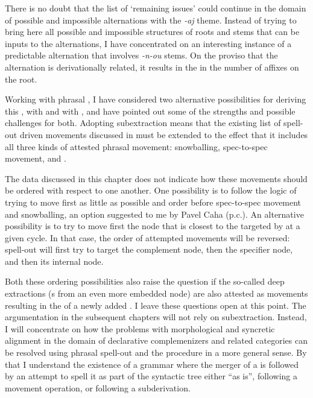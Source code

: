 There is no doubt that the list of `remaining issues' could continue in the domain of possible and impossible  alternations with the \textit{-aj} theme.  Instead of trying to bring here all possible and impossible structures of roots and stems that can be inputs to the alternations, I have concentrated on an interesting instance of a predictable alternation that involves \textit{-n-ou} stems. On the proviso that the alternation is derivationally related, it results in the  in the number of affixes on the root.
\par
Working with phrasal , I have considered two alternative possibilities for deriving this , with  and with , and have pointed out some of the strengths and possible challenges for both. Adopting subextraction means that the existing list of spell-out driven movements discussed in \cite{Starke2018} must be extended to the effect that it includes all
three kinds of attested phrasal movement: snowballing, spec-to-spec movement, and .
\par
The data discussed in this chapter does not indicate how these  movements should be ordered with respect to one another. One possibility is to follow the logic of trying to move first as little as possible and order  before spec-to-spec movement and snowballing, an option suggested to me by  Pavel Caha (p.c.). An alternative possibility is to try to move first the node that is closest to the  targeted by  at a given cycle. In that case, the order of attempted movements will be reversed: spell-out will first try to target the complement node, then the specifier node, and then its internal node.
\par
 Both these ordering possibilities also raise the question if the so-called deep extractions (s from an even more embedded node) are also attested as movements resulting in the  of a newly added . I leave these questions open at this point.
The argumentation in the subsequent chapters will not rely on subextraction. Instead,
I will concentrate on how the problems with morphological  and syncretic alignment in the domain of declarative complemenizers and related categories can be resolved using phrasal spell-out and the  procedure in a more general sense.  By that I understand the existence of a grammar where the merger of a  is followed by an attempt to spell it as part of the syntactic tree either ``as is'', following a movement operation, or following a subderivation.

   
 
 
 
